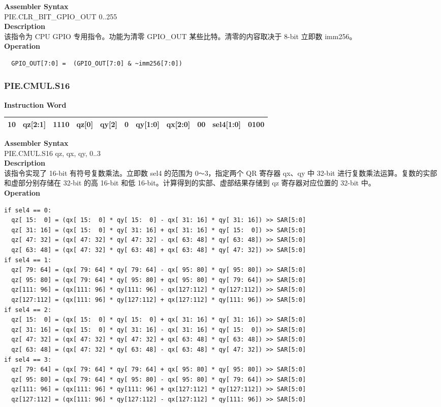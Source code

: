 \textbf{Assembler Syntax} \\
PIE.CLR\_BIT\_GPIO\_OUT 0..255 \\
\textbf{Description} \\
该指令为 CPU GPIO 专用指令。功能为清零 GPIO\_OUT 某些比特。清零的内容取决于 8-bit 立即数 imm256。\\
\textbf{Operation}
\begin{lstlisting}
  GPIO_OUT[7:0] =  (GPIO_OUT[7:0] & ~imm256[7:0])
\end{lstlisting}

\newpage
\subsubsection{PIE.CMUL.S16}\label{instruction:PIECMULS16}
\setlength\tabcolsep{6pt}
\textbf{Instruction Word} \\
\begin{tabular}{|c|c|c|c|c|c|c|c|c|c|c|}
	\hline
	10 & qz[2:1] & 1110 & qz[0] & qy[2] & 0 & qy[1:0] & qx[2:0] & 00 & sel4[1:0] & 0100 \\
	\hline
\end{tabular}

\textbf{Assembler Syntax} \\
PIE.CMUL.S16 qz, qx, qy, 0..3 \\
\textbf{Description} \\
该指令实现了 16-bit 有符号复数乘法。立即数 sel4 的范围为 0\verb+～+3，指定两个 QR 寄存器 qx、qy 中 32-bit 进行复数乘法运算。复数的实部和虚部分别存储在 32-bit 的高 16-bit 和低 16-bit。计算得到的实部、虚部结果存储到 qz 寄存器对应位置的 32-bit 中。\\
\textbf{Operation}
\begin{lstlisting}
if sel4 == 0:
  qz[ 15:  0] = (qx[ 15:  0] * qy[ 15:  0] - qx[ 31: 16] * qy[ 31: 16]) >> SAR[5:0]
  qz[ 31: 16] = (qx[ 15:  0] * qy[ 31: 16] + qx[ 31: 16] * qy[ 15:  0]) >> SAR[5:0]
  qz[ 47: 32] = (qx[ 47: 32] * qy[ 47: 32] - qx[ 63: 48] * qy[ 63: 48]) >> SAR[5:0]
  qz[ 63: 48] = (qx[ 47: 32] * qy[ 63: 48] + qx[ 63: 48] * qy[ 47: 32]) >> SAR[5:0]
if sel4 == 1:
  qz[ 79: 64] = (qx[ 79: 64] * qy[ 79: 64] - qx[ 95: 80] * qy[ 95: 80]) >> SAR[5:0]
  qz[ 95: 80] = (qx[ 79: 64] * qy[ 95: 80] + qx[ 95: 80] * qy[ 79: 64]) >> SAR[5:0]
  qz[111: 96] = (qx[111: 96] * qy[111: 96] - qx[127:112] * qy[127:112]) >> SAR[5:0]
  qz[127:112] = (qx[111: 96] * qy[127:112] + qx[127:112] * qy[111: 96]) >> SAR[5:0]
if sel4 == 2:
  qz[ 15:  0] = (qx[ 15:  0] * qy[ 15:  0] + qx[ 31: 16] * qy[ 31: 16]) >> SAR[5:0]
  qz[ 31: 16] = (qx[ 15:  0] * qy[ 31: 16] - qx[ 31: 16] * qy[ 15:  0]) >> SAR[5:0]
  qz[ 47: 32] = (qx[ 47: 32] * qy[ 47: 32] + qx[ 63: 48] * qy[ 63: 48]) >> SAR[5:0]
  qz[ 63: 48] = (qx[ 47: 32] * qy[ 63: 48] - qx[ 63: 48] * qy[ 47: 32]) >> SAR[5:0]
if sel4 == 3:
  qz[ 79: 64] = (qx[ 79: 64] * qy[ 79: 64] + qx[ 95: 80] * qy[ 95: 80]) >> SAR[5:0]
  qz[ 95: 80] = (qx[ 79: 64] * qy[ 95: 80] - qx[ 95: 80] * qy[ 79: 64]) >> SAR[5:0]
  qz[111: 96] = (qx[111: 96] * qy[111: 96] + qx[127:112] * qy[127:112]) >> SAR[5:0]
  qz[127:112] = (qx[111: 96] * qy[127:112] - qx[127:112] * qy[111: 96]) >> SAR[5:0]
\end{lstlisting}

